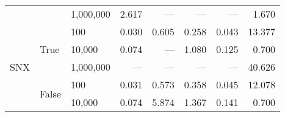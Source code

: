 \begin{tabular}{lllrrrrr}
    &       & 1,000,000 &    2.617 &     --- &    --- &   --- &    1.670 \\
\cline{1-8}
\cline{2-8}
\multirow{5}{*}{SNX} & \multirow{3}{*}{True} & 100 &    0.030 &   0.605 &  0.258 & 0.043 &   13.377 \\
    &       & 10,000 &    0.074 &     --- &  1.080 & 0.125 &    0.700 \\
    &       & 1,000,000 &      --- &     --- &    --- &   --- &   40.626 \\
\cline{2-8}
    & \multirow{2}{*}{False} & 100 &    0.031 &   0.573 &  0.358 & 0.045 &   12.078 \\
    &       & 10,000 &    0.074 &   5.874 &  1.367 & 0.141 &    0.700 \\
\bottomrule
\end{tabular}
